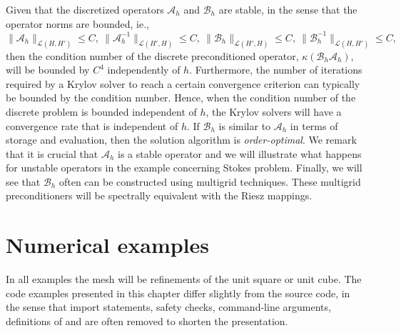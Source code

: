 Given that the discretized operators  $\mathcal{A}_h$ and $\mathcal{B}_h$ are stable, in the sense
that the operator norms are bounded, ie.,  
 \begin{equation}
\|\mathcal{A}_h\|_{\mathcal{L} (H, H')} \le C, \ \|\mathcal{A}_h^{-1}\|_{\mathcal{L} (H', H)} \le C, \ 
\|\mathcal{B}_h\|_{\mathcal{L}(H', H)} \le C,  \  \|\mathcal{B}_h^{-1}\|_{\mathcal{L}(H, H')} \le C, 
\end{equation}
then the condition number of the discrete preconditioned
operator, $\kappa(\mathcal{B}_h \mathcal{A}_h)$, will be bounded by $C^4$ independently of $h$. 
Furthermore, the number of iterations required 
by a Krylov solver to reach a certain convergence criterion can typically be bounded by
the condition number. Hence, when the condition number of the discrete problem is bounded independent
of $h$, the Krylov solvers will have a convergence rate that is independent of $h$. 
If $\mathcal{B}_h$ is similar to $\mathcal{A}_h$ in terms of storage and evaluation, 
then the solution algorithm is \emph{order-optimal}. 
We remark that it is crucial that $\mathcal{A}_h$
is a stable operator and we will illustrate what happens for unstable operators in the example concerning Stokes problem. 
Finally, we will see that $\mathcal{B}_h$ often can be constructed using multigrid techniques. These multigrid
preconditioners will be spectrally equivalent with the Riesz mappings. 

\section{Numerical examples}
In all examples the mesh will be refinements of the unit square or unit cube. 
The code examples presented in this chapter differ slightly from the source
code, in the sense that import statements,  safety checks, command-line arguments, definitions of 
and \emp{Subdomains} are often removed to shorten the presentation. 


